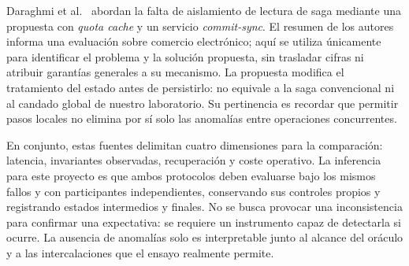 Daraghmi et al.\ \cite{daraghmi2022saga} abordan la falta de aislamiento de lectura de saga mediante una propuesta con \emph{quota cache} y un servicio \emph{commit-sync}. El resumen de los autores informa una evaluación sobre comercio electrónico; aquí se utiliza únicamente para identificar el problema y la solución propuesta, sin trasladar cifras ni atribuir garantías generales a su mecanismo. La propuesta modifica el tratamiento del estado antes de persistirlo: no equivale a la saga convencional ni al candado global de nuestro laboratorio. Su pertinencia es recordar que permitir pasos locales no elimina por sí solo las anomalías entre operaciones concurrentes.

En conjunto, estas fuentes delimitan cuatro dimensiones para la comparación: latencia, invariantes observadas, recuperación y coste operativo. La inferencia para este proyecto es que ambos protocolos deben evaluarse bajo los mismos fallos y con participantes independientes, conservando sus controles propios y registrando estados intermedios y finales. No se busca provocar una inconsistencia para confirmar una expectativa: se requiere un instrumento capaz de detectarla si ocurre. La ausencia de anomalías solo es interpretable junto al alcance del oráculo y a las intercalaciones que el ensayo realmente permite.
